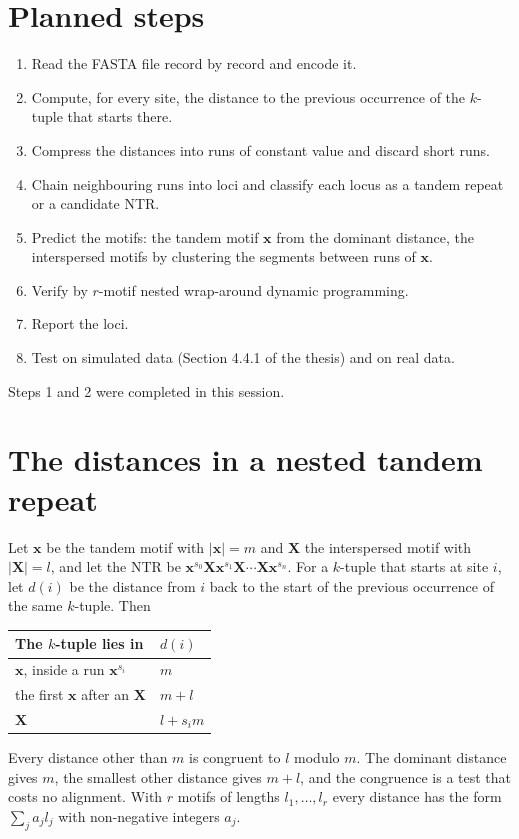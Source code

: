 \documentclass[11pt,a4paper]{article}
\begin{document}
\section{Planned steps}
\begin{enumerate}
\item Read the FASTA file record by record and encode it.
\item Compute, for every site, the distance to the previous occurrence of the
      $k$-tuple that starts there.
\item Compress the distances into runs of constant value and discard short runs.
\item Chain neighbouring runs into loci and classify each locus as a tandem
      repeat or a candidate NTR.
\item Predict the motifs: the tandem motif $\mathbf{x}$ from the dominant
      distance, the interspersed motifs by clustering the segments between runs
      of $\mathbf{x}$.
\item Verify by $r$-motif nested wrap-around dynamic programming.
\item Report the loci.
\item Test on simulated data (Section 4.4.1 of the thesis) and on real data.
\end{enumerate}
Steps 1 and 2 were completed in this session.

\section{The distances in a nested tandem repeat}
Let $\mathbf{x}$ be the tandem motif with $|\mathbf{x}|=m$ and $\mathbf{X}$ the
interspersed motif with $|\mathbf{X}|=l$, and let the NTR be
$\mathbf{x}^{s_0}\mathbf{X}\mathbf{x}^{s_1}\mathbf{X}\cdots\mathbf{X}\mathbf{x}^{s_n}$.
For a $k$-tuple that starts at site $i$, let $d(i)$ be the distance from $i$ back
to the start of the previous occurrence of the same $k$-tuple. Then
\begin{center}
\begin{tabular}{ll}
\toprule
The $k$-tuple lies in & $d(i)$ \\
\midrule
$\mathbf{x}$, inside a run $\mathbf{x}^{s_i}$ & $m$ \\
the first $\mathbf{x}$ after an $\mathbf{X}$ & $m+l$ \\
$\mathbf{X}$ & $l+s_i m$ \\
\bottomrule
\end{tabular}
\end{center}
Every distance other than $m$ is congruent to $l$ modulo $m$. The dominant
distance gives $m$, the smallest other distance gives $m+l$, and the
congruence is a test that costs no alignment. With $r$ motifs of lengths
$l_1,\ldots,l_r$ every distance has the form $\sum_j a_j l_j$ with non-negative
integers $a_j$.
\end{document}
